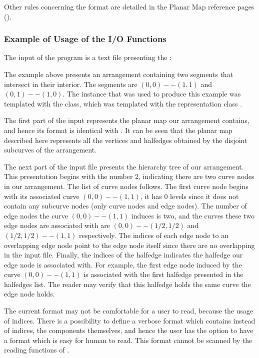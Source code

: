 \begin{ccAdvanced}
Other rules concerning the format are detailed in the Planar Map 
reference pages ().

\subsubsection{Example of Usage of the I/O Functions}
\label{ARR_sec:example11}

The input of the program is a text file presenting the :

The example above presents an arrangement containing two segments that 
intersect in their interior. The segments are $(0,0) -- (1,1)$ and $(0,1) --
(1,0)$.  The  instance that was used to produce this example 
was templated  with the  class, which was 
templated with the representation class .

The first part of the input represents the planar map our arrangement 
contains, and hence its format is identical with . 
It can be seen that the planar map described here represents all the vertices 
and halfedges obtained by the disjoint subcurves of the arrangement.

The next part of the input file presents the hierarchy tree of our 
arrangement. This presentation begins with the number 2, indicating there are 
two curve nodes in our arrangement. The list of curve nodes follows.
The first curve node begins with its associated curve $(0,0) -- (1,1)$, 
it has 0 levels since it does not contain any subcurve nodes (only curve 
nodes and edge nodes). 
The number of edge nodes the curve $(0,0) -- (1,1)$ induces is two, 
and the curves these two edge nodes are associated with are 
$(0,0) -- (1/2,1/2)$ and $(1/2,1/2) -- (1,1)$ respectively. 
The indices of each edge node to an overlapping edge node point to the edge 
node itself since there are no overlapping in the input file. 
Finally, the indices of the halfedge indicates the halfedge our edge node is 
associated with. 
For example, the first edge node induced by the curve $(0,0) -- (1,1)$ is 
associated  with the first halfedge presented in the halfedges list. The 
reader may verify that this halfedge holds the same curve the edge node holds.

The current format may not be comfortable for a user to read, because the 
usage of indices. There is a possibility to define a verbose format which 
contains instead of indices, the components themselves, and hence the user 
has the option to have a format which is easy for human to read.
This format cannot be scanned by the reading functions of .


\end{ccAdvanced}
